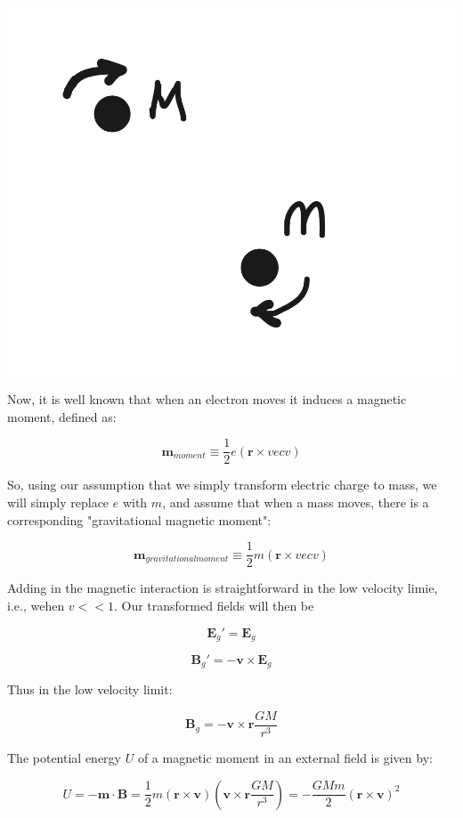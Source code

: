 \documentclass {article}
\renewcommand\vec{\mathbf}
\begin{document}
\begin{center}
	\includegraphics[scale=0.1]{autodraw.png}
\end{center}

Now, it is well known that when an electron moves it induces a magnetic moment, defined as:

$$\vec m_{moment} \equiv \frac 1 {2} e (\vec r \times vec v)$$

So, using our assumption that we simply transform electric charge to mass, we will simply replace $e$ with $m$, and assume that when a mass moves, there is a corresponding "gravitational magnetic moment":

$$\vec m_{gravitational moment} \equiv \frac 1 {2} m (\vec r \times vec v)$$

Adding in the magnetic interaction is straightforward in the low velocity limie, i.e., wehen $v << 1$. Our transformed fields will then be

$$\vec E_g' = \vec E_g$$

$$ \vec B_g' = - \vec v \times \vec E_g$$

Thus in the low velocity limit:

$$\vec B_g = - \vec v \times \vec r \frac {GM} {r^3} $$ 

The potential energy $U$ of a magnetic moment in an external field is given by:

$$U = - \vec m \cdot \vec B = \frac 1 2 m (\vec r \times \vec v)\left(\vec v \times \vec r \frac {GM} {r^3} \right) = - \frac {GMm} 2 (\vec r \times \vec v)^2$$
\end{document}
